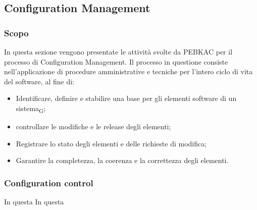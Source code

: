\subsection{Configuration Management}
\subsubsection{Scopo}
In questa sezione vengono presentate le attività svolte da PEBKAC per il processo di Configuration Management. Il processo in questione consiste nell'applicazione di procedure amministrative e tecniche per l'intero ciclo di vita del software, al fine di:
\begin{itemize}
    \item Identificare, definire e stabilire una base per gli elementi software di un sistema\textsubscript{G};
    \item controllare le modifiche e le release degli elementi;
    \item Registrare lo stato degli elementi e delle richieste di modifica;
    \item Garantire la completezza, la coerenza e la correttezza degli elementi.
\end{itemize}

\subsubsection{Configuration control}
In questa 
In questa 